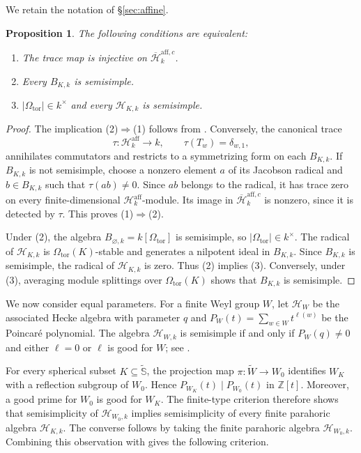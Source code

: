 \documentclass[11pt,letterpaper]{amsart}
\newtheorem{proposition}[theorem]{Proposition}
\theoremstyle{definition}
\numberwithin{equation}{section}
\numberwithin{theorem}{section}
\newcommand{\kk}{k}
\newcommand{\ZZ}{\mathbb Z}
\newcommand{\cH}{\mathcal H}
\newcommand{\bH}{\overline{\mathcal H}}
\newcommand{\Wt}{\tilde W}
\newcommand{\Saff}{\widetilde{\mathbb S}}
\begin{document}
We retain the notation of \S\ref{sec:affine}.

\begin{proposition}\label{cor:affine-injectivity}
The following conditions are equivalent:
\begin{enumerate}
\item The trace map is injective on $\bH_\kk^{\mathrm{aff},c}$.
\item Every $B_{K,\kk}$ is semisimple.
\item $|\Omega_{\mathrm{tor}}|\in\kk^\times$ and
      every $\cH_{K,\kk}$ is semisimple.
\end{enumerate}
\end{proposition}

\begin{proof}
The implication (2)$\Rightarrow$(1) follows from
.
Conversely, the canonical trace
\[
 \tau:
 \text{$\cH_\kk^{\mathrm{aff}}$}
 \longrightarrow\kk,\qquad
 \tau(T_w)=\delta_{w,1},
\]
annihilates commutators and restricts to a symmetrizing
form on each $B_{K,\kk}$.
If $B_{K,\kk}$ is not semisimple, choose a nonzero
element $a$ of its Jacobson radical and
$b\in B_{K,\kk}$ such that $\tau(ab)\ne0$.
Since $ab$ belongs to the radical, it has trace zero
on every finite-dimensional $\cH_\kk^{\mathrm{aff}}$-module.
Its image in $\bH_\kk^{\mathrm{aff},c}$
is nonzero, since it is detected by $\tau$.
This proves (1)$\Rightarrow$(2).

Under (2), the algebra
$B_{\varnothing,\kk}=\kk[\Omega_{\mathrm{tor}}]$
is semisimple, so $|\Omega_{\mathrm{tor}}|\in\kk^\times$.
The radical of $\cH_{K,\kk}$ is
$\Omega_{\mathrm{tor}}(K)$-stable and generates a
nilpotent ideal in $B_{K,\kk}$. Since $B_{K, \kk}$ is semisimple, 
the radical of $\cH_{K,\kk}$ is zero.
Thus (2) implies (3).
Conversely, under (3), averaging module splittings
over $\Omega_{\mathrm{tor}}(K)$ shows that
$B_{K,\kk}$ is semisimple.
\end{proof}

We now consider equal parameters. For a finite Weyl group $W$, let $\cH_W$ be the associated Hecke algebra with parameter $q$ and $P_W(t)=\sum_{w\in W}t^{\ell(w)}$ be the Poincar\'e polynomial. The algebra $\cH_{W,\kk}$ is semisimple if and only if $P_W(q)\ne0$ and either $\ell=0$ or $\ell$ is good for $W$; see
\cite[Proposition~5.3 and the table in \S5.2]{GR}.

For every spherical subset $K\subseteq\Saff$,
the projection map $\pi: \Wt \to W_0$ identifies $W_K$ with a
reflection subgroup of $W_0$. Hence $P_{W_K}(t)\mid P_{W_0}(t)$ in $\ZZ[t]$.
Moreover, a good prime for $W_0$ is good for $W_K$.
The finite-type criterion therefore shows that
semisimplicity of $\cH_{W_0,\kk}$ implies
semisimplicity of every finite parahoric algebra
$\cH_{K,\kk}$.
The converse follows by taking the finite parahoric
algebra $\cH_{W_0,\kk}$. Combining this observation with
 gives the following
criterion.
\end{document}
